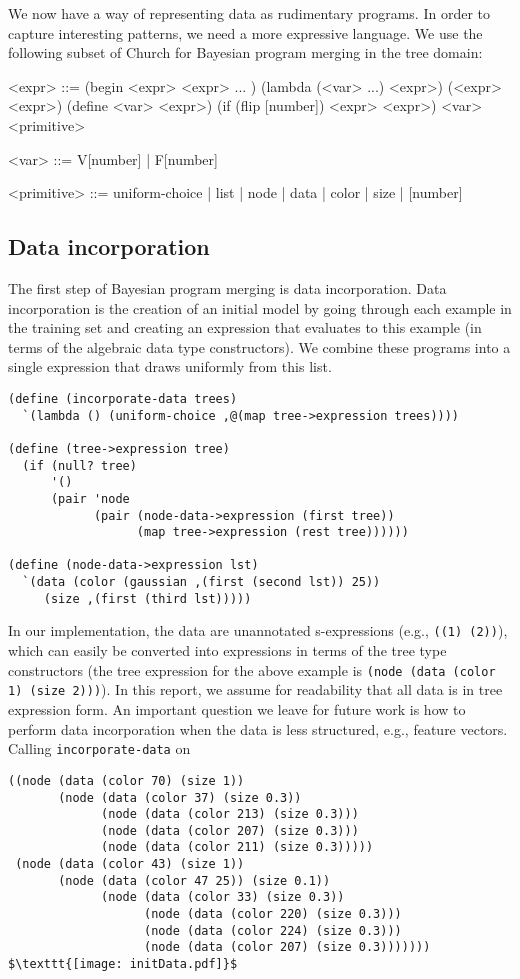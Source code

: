 \documentclass[a4paper,10pt]{article}
\begin{document}
We now have a way of representing data as rudimentary programs.  In order to capture interesting patterns, we need a more expressive language.  We use the following subset of Church for Bayesian program merging in the tree domain:
\begin{grammar}
<expr> ::= (begin <expr> <expr> ... ) 
\alt (lambda (<var> ...) <expr>)
\alt (<expr> <expr>)  
\alt (define <var> <expr>)
\alt (if (flip [number]) <expr> <expr>)
\alt <var> 
\alt <primitive>

<var> ::= V[number] | F[number] 

<primitive> ::= uniform-choice | list | node | data | color | size | [number]
\end{grammar}

\subsection{Data incorporation}
The first step of Bayesian program merging is data incorporation.  Data incorporation is the creation of an initial model by going through each example in the training set and creating an expression that evaluates to this example (in terms of the algebraic data type constructors).  We combine these programs into a single expression that draws uniformly from this list.
\begin{lstlisting}[frame=trBLsingle]
(define (incorporate-data trees)
  `(lambda () (uniform-choice ,@(map tree->expression trees))))

(define (tree->expression tree)
  (if (null? tree)
      '()
      (pair 'node
            (pair (node-data->expression (first tree)) 
                  (map tree->expression (rest tree))))))

(define (node-data->expression lst)
  `(data (color (gaussian ,(first (second lst)) 25)) 
	 (size ,(first (third lst)))))
\end{lstlisting}
In our implementation, the data are unannotated s-expressions (e.g., \texttt{((1) (2))}), which can easily be converted into expressions in terms of the tree type constructors (the tree expression for the above example is \texttt{(node (data (color 1) (size 2)))}).  In this report, we assume for readability that all data is in tree expression form. An important question we leave for future work is how to perform data incorporation when the data is less structured, e.g., feature vectors. Calling \texttt{incorporate-data} on
\begin{lstlisting}[mathescape=true]
((node (data (color 70) (size 1))
       (node (data (color 37) (size 0.3))
             (node (data (color 213) (size 0.3)))
             (node (data (color 207) (size 0.3)))
             (node (data (color 211) (size 0.3)))))
 (node (data (color 43) (size 1))
       (node (data (color 47 25)) (size 0.1))
             (node (data (color 33) (size 0.3))
                   (node (data (color 220) (size 0.3)))
                   (node (data (color 224) (size 0.3)))
                   (node (data (color 207) (size 0.3)))))))
$\texttt{[image: initData.pdf]}$
\end{lstlisting}
\end{document}
